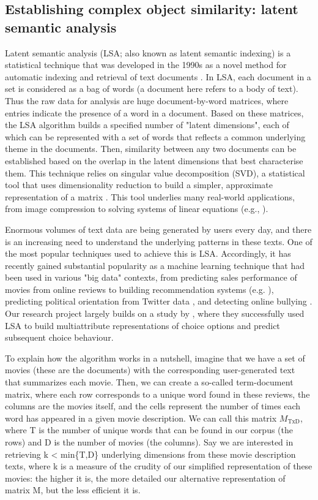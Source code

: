 \documentclass[11pt,a4paper]{article}
\begin{document}
\subsection{Establishing complex object similarity: latent semantic analysis} \label{lsa_description}


Latent semantic analysis (LSA; also known as latent semantic indexing) is a statistical technique that was developed in the 1990s as a novel method for automatic indexing and retrieval of text documents \cite{Deerwester1990}. 
In LSA, each document in a set is considered as a bag of words (a document here refers to a body of text). Thus the raw data for analysis are huge document-by-word matrices, where entries indicate the presence of a word in a document. Based on these matrices, the LSA algorithm builds a specified number of "latent dimensions", each of which can be represented with a set of words that reflects a common underlying theme in the documents. Then, similarity between any two documents can be established based on the overlap in the latent dimensions that best characterise them. This technique relies on singular value decomposition (SVD), a statistical tool that uses dimensionality reduction to build a simpler, approximate representation of a matrix \cite{Leskovec2014}. This tool underlies many real-world applications, from image compression to solving systems of linear equations (e.g., ). 

Enormous volumes of text data are being generated by users every day, and there is an increasing need to understand the underlying patterns in these texts. One of the most popular techniques used to achieve this is LSA. Accordingly, it has recently gained substantial popularity as a machine learning technique that had been used in various "big data" contexts, from predicting sales performance of movies from online reviews \cite{Yu2012} to building recommendation systems (e.g. ), predicting political orientation from Twitter data \cite{Conover2011}, and detecting online bullying \cite{Bigelow2016}. Our research project largely builds on a study by , where they successfully used LSA to build multiattribute representations of choice options and predict subsequent choice behaviour.


To explain how the algorithm works in a nutshell, imagine that we have a set of movies (these are the documents) with the corresponding user-generated text that summarizes each movie. Then, we can create a so-called term-document matrix, where each row corresponds to a unique word found in these reviews, the columns are the movies itself, and the cells represent the number of times each word has appeared in a given movie description. We can call this matrix $M_{\text{TxD}}$, where T is the number of unique words that can be found in our corpus (the rows) and D is the number of movies (the columns). Say we are interested in retrieving k < min\{T,D\} underlying dimensions from these movie description texts, where k is a measure of the crudity of our simplified representation of these movies: the higher it is, the more detailed our alternative representation of matrix M, but the less efficient it is. 
\end{document}
